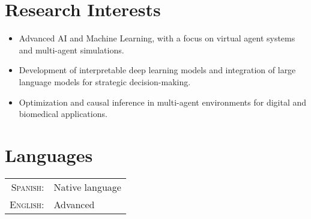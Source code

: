 \documentclass[a4paper,10pt]{article} %
\begin{document}
\section{Research Interests}
\begin{itemize}
    \item Advanced AI and Machine Learning, with a focus on virtual agent systems and multi-agent simulations.
    \item Development of interpretable deep learning models and integration of large language models for strategic decision-making.
    \item Optimization and causal inference in multi-agent environments for digital and biomedical applications.
\end{itemize}


\vspace{1em}
\section{Languages}

\begin{tabular}{rl}
\textsc{Spanish:} & Native language \\
\textsc{English:} & Advanced \\
\end{tabular}
\end{document}
